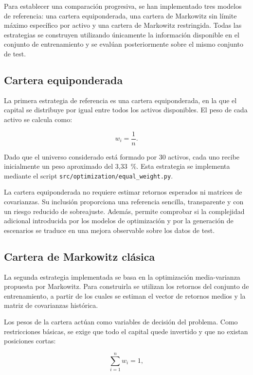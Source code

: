 Para establecer una comparación progresiva, se han implementado tres modelos de referencia: una cartera equiponderada, una cartera de Markowitz sin límite máximo específico por activo y una cartera de Markowitz restringida. Todas las estrategias se construyen utilizando únicamente la información disponible en el conjunto de entrenamiento y se evalúan posteriormente sobre el mismo conjunto de test.

\subsection{Cartera equiponderada}

La primera estrategia de referencia es una cartera equiponderada, en la que el capital se distribuye por igual entre todos los activos disponibles. El peso de cada activo se calcula como:

\begin{equation}
w_i = \frac{1}{n}.
\end{equation}

Dado que el universo considerado está formado por 30 activos, cada uno recibe inicialmente un peso aproximado del 3,33~\%. Esta estrategia se implementa mediante el script \texttt{src/optimization/equal\_weight.py}.

La cartera equiponderada no requiere estimar retornos esperados ni matrices de covarianzas. Su inclusión proporciona una referencia sencilla, transparente y con un riesgo reducido de sobreajuste. Además, permite comprobar si la complejidad adicional introducida por los modelos de optimización y por la generación de escenarios se traduce en una mejora observable sobre los datos de test.

\subsection{Cartera de Markowitz clásica}

La segunda estrategia implementada se basa en la optimización media-varianza propuesta por Markowitz. Para construirla se utilizan los retornos del conjunto de entrenamiento, a partir de los cuales se estiman el vector de retornos medios y la matriz de covarianzas histórica.

Los pesos de la cartera actúan como variables de decisión del problema. Como restricciones básicas, se exige que todo el capital quede invertido y que no existan posiciones cortas:

\begin{equation}
\sum_{i=1}^{n} w_i = 1,
\end{equation}

